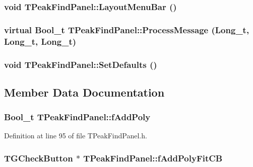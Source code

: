 \subsubsection[{LayoutMenuBar}]{\setlength{\rightskip}{0pt plus 5cm}void TPeakFindPanel::LayoutMenuBar ()\hspace{0.3cm}{\ttfamily  [private]}}\label{classTPeakFindPanel_a834f0a5fd6ee1348f8120ffe18d211b0}
\subsubsection[{ProcessMessage}]{\setlength{\rightskip}{0pt plus 5cm}virtual Bool\_\-t TPeakFindPanel::ProcessMessage (Long\_\-t, \/  Long\_\-t, \/  Long\_\-t)\hspace{0.3cm}{\ttfamily  [virtual]}}\label{classTPeakFindPanel_aa932e366d895bf2234a115ad680d8618}
\subsubsection[{SetDefaults}]{\setlength{\rightskip}{0pt plus 5cm}void TPeakFindPanel::SetDefaults ()\hspace{0.3cm}{\ttfamily  [private]}}\label{classTPeakFindPanel_aea3a5833a3b95b3ee5375206e3040e8c}


\subsection{Member Data Documentation}
\subsubsection[{fAddPoly}]{\setlength{\rightskip}{0pt plus 5cm}Bool\_\-t {\bf TPeakFindPanel::fAddPoly}\hspace{0.3cm}{\ttfamily  [protected]}}\label{classTPeakFindPanel_af35ee1eb3a84fe552ac447157b0ad18f}


Definition at line 95 of file TPeakFindPanel.h.
\subsubsection[{fAddPolyFitCB}]{\setlength{\rightskip}{0pt plus 5cm}TGCheckButton $\ast$ {\bf TPeakFindPanel::fAddPolyFitCB}\hspace{0.3cm}{\ttfamily  [private]}}\label{classTPeakFindPanel_ac331a9f42cb591ce38142e893154588f}


